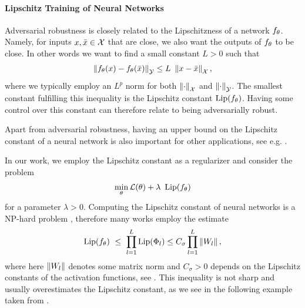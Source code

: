 \paragraph{Lipschitz Training of Neural Networks}
%
Adversarial robustness is closely related to the Lipschitzness of a network $f_\theta$. Namely, for inputs $x,\bar{x}\in\mathcal{X}$ that are close, we also want the outputs of $f_\theta$ to be close. In other words we want to find a small constant $L>0$ such that
%
\begin{align*}
\norm{\net_\param(\inp) - \net_\param(\inpp)}_\Oup \leq L\ \norm{\inp-\inpp}_\Inp,
\end{align*}
%
where we typically employ an $L^p$ norm for both $\left\|\cdot\right\|_{\mathcal{X}}$ and $\left\|\cdot\right\|_{\mathcal{\mathcal{Y}}}$.
%
The smallest constant fulfilling this inequality is the Lipschitz constant $\operatorname{Lip}(f_\theta)$. Having some control over this constant can therefore relate to being adversarially robust.
%
\begin{remark}{}{}
Apart from adversarial robustness, having an upper bound on the Lipschitz constant of a neural network is also important for other applications, see e.g. \cite{hasannasab2020parseval, arjovsky2017wasserstein}.
\end{remark}
%
%
\noindent%
In our work, we employ the Lipschitz constant as a regularizer and consider the problem
%
\begin{align}\label{eq:LipReg}
\min_\theta \mathcal{L}(\theta) +\lambda\ \operatorname{Lip}(f_\theta)
\end{align}
%
for a parameter $\lambda>0$. Computing the Lipschitz constant of neural networks is a NP-hard problem \cite{scaman2018lipschitz}, therefore many works employ the estimate
%
\begin{align}\label{ineq:lip_weights}
\operatorname{Lip}(f_\theta) \ \leq \ \prod_{l=1}^L  \operatorname{Lip}(\Phi_l) \leq 
C_\sigma \prod_{l=1}^L \left\|W_l\right\|,
\end{align}
%
where here $\left\|W_l\right\|$ denotes some matrix norm and $C_\sigma>0$ depends on the Lipschitz constants of the activation functions, see \cite{Anil2019,gouk2020regularisation, Krishnan2020, Roth2020}.
%
This inequality is not sharp and usually overestimates the Lipschitz constant, as we see in the following example taken from \cite{bungert2021clip}.
%
